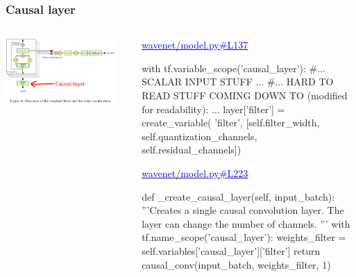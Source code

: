 \documentclass[8pt]{beamer}
\begin{document}
\begin{frame}[fragile]
\frametitle{Causal layer}
\begin{columns}
\begin{column}{0.5\textwidth}
 
\includegraphics[width=0.9\textwidth]{./dl3_images/causal_layer.png}

\end{column}
\begin{column}{0.5\textwidth}
 
 \href{https://github.com/ibab/tensorflow-wavenet/blob/master/wavenet/model.py\#L137}{\textcolor{blue}{wavenet/model.py\#L137}}
 
 \begin{verbnobox}[\tiny]
with tf.variable_scope('causal_layer'):
        #... SCALAR INPUT STUFF ...
        #... HARD TO READ STUFF COMING DOWN TO (modified for readability): ...
    layer['filter'] = create_variable(
        'filter',
        [self.filter_width,
         self.quantization_channels,
         self.residual_channels])
 \end{verbnobox}
 
 \href{https://github.com/ibab/tensorflow-wavenet/blob/master/wavenet/model.py\#L223}{\textcolor{blue}{wavenet/model.py\#L223}}
 
 \begin{verbnobox}[\tiny]
def _create_causal_layer(self, input_batch):
    '''Creates a single causal convolution layer.
    The layer can change the number of channels.
    '''
    with tf.name_scope('causal_layer'):
        weights_filter = self.variables['causal_layer']['filter']
    return causal_conv(input_batch, weights_filter, 1)
 \end{verbnobox}
\end{column}
\end{columns} 
 
\end{frame}
\end{document}
